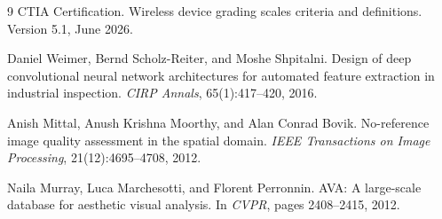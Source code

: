 \documentclass[10pt]{article}
\begin{document}
\begin{thebibliography}{9}
CTIA Certification.
Wireless device grading scales criteria and definitions.
Version 5.1, June 2026.

Daniel Weimer, Bernd Scholz-Reiter, and Moshe Shpitalni.
Design of deep convolutional neural network architectures for automated feature extraction in industrial inspection.
\emph{CIRP Annals}, 65(1):417--420, 2016.

Anish Mittal, Anush Krishna Moorthy, and Alan Conrad Bovik.
No-reference image quality assessment in the spatial domain.
\emph{IEEE Transactions on Image Processing}, 21(12):4695--4708, 2012.

Naila Murray, Luca Marchesotti, and Florent Perronnin.
AVA: A large-scale database for aesthetic visual analysis.
In \emph{CVPR}, pages 2408--2415, 2012.
\end{thebibliography}
\end{document}
